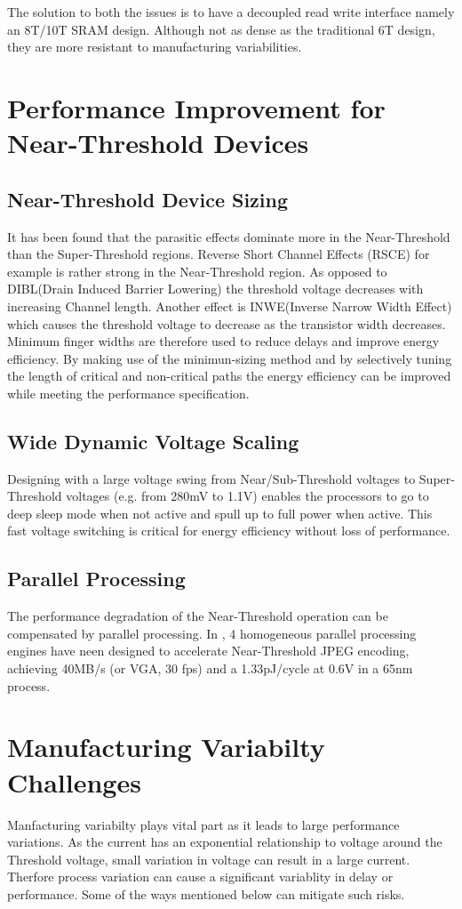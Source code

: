 \documentclass[conference]{IEEEtran}
\begin{document}
The solution to both the issues is to have a decoupled read write interface namely an 8T/10T SRAM design. Although not as dense as the traditional 6T design, they are more resistant to manufacturing variabilities.

\section{Performance Improvement for Near-Threshold Devices} \label{sec:Perf_challenges}

\subsection{Near-Threshold Device Sizing}
It has been found that the parasitic effects dominate more in the Near-Threshold than the Super-Threshold regions. Reverse Short Channel Effects (RSCE) for example is rather strong in the Near-Threshold region. As opposed to DIBL(Drain Induced Barrier Lowering) the threshold voltage decreases with increasing Channel length. Another effect is INWE(Inverse Narrow Width Effect) which causes the threshold voltage to decrease as the transistor width decreases. Minimum finger widths are therefore used to reduce delays and improve energy efficiency. By making use of the minimun-sizing method and by selectively tuning the length of critical and non-critical paths the energy efficiency can be improved while meeting the performance specification.

\subsection{Wide Dynamic Voltage Scaling}
Designing with a large voltage swing from Near/Sub-Threshold voltages to Super-Threshold voltages (e.g. from 280mV to 1.1V) enables the processors to go to deep sleep mode when not active and spull up to full power when active. This fast voltage switching is critical for energy efficiency without loss of performance.
\subsection{Parallel Processing}
The performance degradation of the Near-Threshold operation can be compensated by parallel processing. In \cite{b8}, 4 homogeneous parallel processing engines have neen designed to accelerate Near-Threshold JPEG encoding, achieving 40MB/s (or VGA, 30 fps) and a 1.33pJ/cycle at 0.6V in a 65nm process.

\section{Manufacturing Variabilty Challenges} \label{sec:Variablity}
Manfacturing variabilty plays vital part as it leads to large performance variations. As the current has an exponential relationship to voltage around the Threshold voltage, small variation in voltage can result in a large current. Therfore process variation can cause a significant variablity in delay or performance. Some of the ways mentioned below can mitigate such risks.
\end{document}
